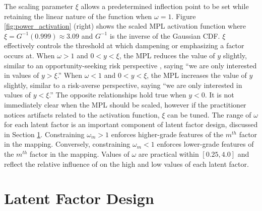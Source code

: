 The scaling parameter $\xi$ allows a predetermined inflection point to be set while retaining the linear nature of the function when $\omega = 1$. Figure \ref{fig:power_activation} (right) shows the scaled \gls{MPL} activation function where $\xi = G^{-1}(0.999) \approx 3.09$ and $G^{-1}$ is the inverse of the Gaussian \gls{CDF}. $\xi$ effectively controls the threshold at which dampening or emphasizing a factor occurs at. When $\omega > 1$ and $0 < y < \xi$, the \gls{MPL} reduces the value of $y$ slightly, similar to an opportunity-seeking risk perspective \citep{eidsvik2015value}, saying ``we are only interested in values of $y > \xi$.'' When $\omega < 1$ and $0 < y < \xi$, the \gls{MPL} increases the value of $y$ slightly, similar to a risk-averse perspective, saying ``we are only interested in values of $y < \xi$.'' The opposite relationships hold true when $y < 0$. It is not immediately clear when the \gls{MPL} should be scaled, however if the practitioner notices artifacts related to the activation function, $\xi$ can be tuned. The range of $\omega$ for each latent factor is an important component of latent factor design, discussed in Section \ref{sec:04factord}. Constraining $\omega_{m} > 1$ enforces higher-grade features of the $m^{th}$ factor in the mapping. Conversely, constraining $\omega_{m} < 1$ enforces lower-grade features of the $m^{th}$ factor in the mapping. Values of $\omega$ are practical within $[0.25, 4.0]$ and reflect the relative influence of on the high and low values of each latent factor.


\FloatBarrier
\section{Latent Factor Design}
\label{sec:04factord}

